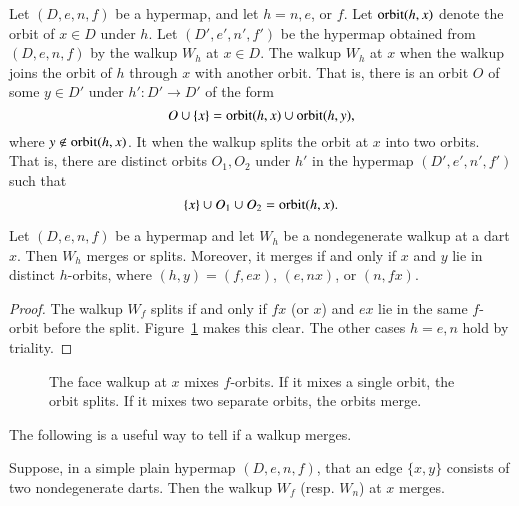 \begin{definition} 
Let $(D,e,n,f)$ be a hypermap, and let $h=n,e$, or $f$.  Let ${\operatorname{orbit}}(h,x)$
denote the orbit of $x\in D$ under $h$.  Let $(D',e',n',f')$ be the hypermap obtained
from $(D,e,n,f)$ by the walkup $W_h$ at $x\in D$.
The walkup $W_h$ at $x$  when the walkup joins the
orbit of $h$ through $x$ with another orbit.  That is, there is an orbit $O$ of some
$y\in D'$ under $h':D'\to D'$ of the form
\begin{displaymath}
O \cup\{x\} = {\operatorname{orbit}}(h,x) \cup {\operatorname{orbit}}(h,y),
\end{displaymath}
where $y\not\in {\operatorname{orbit}}(h,x)$.
It 
when the walkup splits the orbit at $x$ into two orbits.  That is, there are 
distinct orbits $O_1,O_2$ under $h'$ in the hypermap $(D',e',n',f')$ such that
\begin{displaymath}
\{x\}\cup O_1\cup O_2 = {\operatorname{orbit}}(h,x).
\end{displaymath}
%
%
%
\end{definition}

\begin{lemma} 
  Let $(D,e,n,f)$ be a hypermap and let $W_h$ be a nondegenerate
  walkup at a dart $x$.  Then $W_h$ merges or splits. Moreover, it merges if
  and only if $x$ and $y$ lie in distinct $h$-orbits, where
  $(h,y)=(f,e x)$,  $(e,n x)$, or $(n,f x)$.
\end{lemma}

\begin{proof} The walkup $W_f$ splits if and only if $f x$ 
(or $x$)
and $e x$ lie in the same $f$-orbit before the split. 
Figure~\ref{fig:split} makes this clear.
The other cases $h=e,n$ hold by triality.
\end{proof}


\begin{figure}[htb]
\centering
{}
\caption{The face walkup at $x$ mixes $f$-orbits.  If it mixes a
single orbit, the orbit splits. If it mixes two separate orbits, the
orbits merge. }
\label{fig:split}
\end{figure}

The following is a useful way to tell if a walkup merges.


\begin{lemma}  
Suppose, in a simple plain hypermap $(D,e,n,f)$, that an edge $\{x,y\}$ consists
of two nondegenerate darts.  Then the walkup $W_f$ (resp. $W_n$) at
$x$ merges.
\end{lemma}
%

